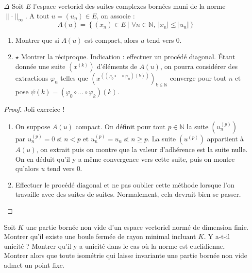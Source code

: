 \documentclass[french,a4paper]{article}
\newcommand{\N}{\mathbb{N}}
\theoremstyle{plain}
\theoremstyle{definition}
\theoremstyle{remark}
\begin{document}
\begin{ex}{$\Delta$}
	Soit $E$ l'espace vectoriel des suites complexes bornées muni de la norme $\lVert\cdot\rVert_\infty$. A tout $u=(u_n)\in E$, on associe : $$A(u)=\left\{(x_n)\in E\mid \forall n\in\N,\ \lvert x_n\rvert \leqslant\lvert u_n\rvert\right\}$$
	\begin{enumerate}
		\item  Montrer que si $A(u)$ est compact, alors $u$ tend vers $0$.
		\item $\star$ Montrer la réciproque. Indication : effectuer un procédé diagonal. Étant donnée une suite $(x^{(k)})$ d'éléments de $A(u)$, on pourra considérer des extractions $\varphi_n$ telles que $\left(x^{\left((\varphi_0\circ\ldots\circ\varphi_n)(k)\right)}\right)_{k\in\N}$ converge pour tout $n$ et pose $\psi(k)=(\varphi_0\circ\ldots\circ\varphi_k)(k)$.
	\end{enumerate}
\end{ex}
\begin{proof}
	Joli exercice !
	\begin{enumerate}
		\item On suppose $A(u)$ compact. On définit pour tout $p\in\N$ la suite $(u_n^{(p)})$ par $u_n^{(p)}=0$ si $n<p$ et $u_n^{(p)}=u_n$ si $n\geqslant p$. La suite $(u^{(p)})$ appartient à $A(u)$, on extrait puis on montre que la valeur d'adhérence est la suite nulle. On en déduit qu'il y a même convergence vers cette suite, puis on montre qu'alors $u$ tend vers $0$.
		\item Effectuer le procédé diagonal et ne pas oublier cette méthode lorsque l'on travaille avec des suites de suites. Normalement, cela devrait bien se passer.
	\end{enumerate}
\end{proof}

\begin{ex}{}
	Soit $K$ une partie bornée non vide d'un espace vectoriel normé de dimension finie. Montrer qu'il existe une boule fermée de rayon minimal incluant $K$. Y a-t-il unicité ? Montrer qu'il y a unicité dans le cas où la norme est euclidienne. Montrer alors que toute isométrie qui laisse invariante une partie bornée non vide admet un point fixe.
\end{ex}
\end{document}
